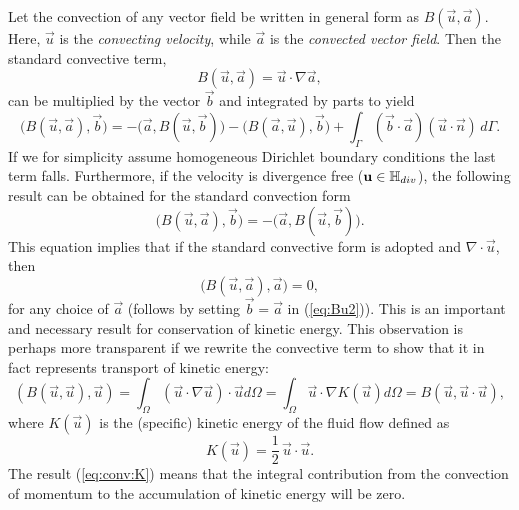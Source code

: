 Let the convection of any vector field be written in general form as $B(\vec{u},\vec{a})$. Here, $\vec{u}$ is the \emph{convecting velocity}, while $\vec{a}$ is the \emph{convected vector field}. Then the standard convective term,
\begin{equation}
B(\vec{u},\vec{a}) = \vec{u}\cdot \nabla \vec{a},
\end{equation}
can be multiplied by the vector $\vec{b}$ and integrated by parts to yield
\begin{equation}
 \bigl( B(\vec{u}, \vec{a}), \vec{b}\bigr) = -\bigl( \vec{a}, B(\vec{u},\vec{b})\bigr) - \bigl( B (\vec{a}, \vec{u}), \vec{b} \bigr) + \int_{\Gamma} \left(\vec{b} \cdot \vec{a} \right)\left(\vec{u} \cdot \vec{n} \right) \, d\Gamma.
\label{eq:Bu1}
\end{equation}
If we for simplicity assume homogeneous Dirichlet boundary conditions the last term falls. Furthermore, if the velocity is divergence free ($\mathbf{ u }\in \mathbb{H}_{div}$), the following result can be obtained for the standard convection form
\begin{equation}
\bigl( B(\vec{u},\vec{a}), \vec{b} \bigr) = -\bigl( \vec{a}, B(\vec{u},\vec{b}) \bigr).
\label{eq:Bu2}
\end{equation}
This equation implies that if
the standard convective form is adopted and $\nabla\cdot\vec{u}$, then
\begin{equation}
\bigl( B(\vec{u}, \vec{a}), \vec{a} \bigr) = 0,
\label{eq:B0}
\end{equation}
for any choice of $\vec{a}$ (follows by setting $\vec{b}=\vec{a}$ in
(\ref{eq:Bu2})). This is an important and necessary result for
conservation of kinetic energy. This observation is perhaps more
transparent if we rewrite the convective term to show that it in fact
represents transport of kinetic energy:
\begin{equation}
\label{eq:conv:K}
\left(B(\vec{u}, \vec{u}), \vec{u} \right)
= \int_\Omega (\vec{u}\cdot\nabla\vec{u})\cdot\vec{u}d\Omega
= \int_\Omega \vec{u}\cdot\nabla K(\vec{u}) d\Omega
= B(\vec{u}, \vec{u}\cdot\vec{u}),
\end{equation}
where $K(\vec{u})$ is the (specific) kinetic energy of the fluid flow defined
as
\begin{equation}
 K(\vec{u})=\frac{1}{2}\, \vec{u}\cdot \vec{u}. \label{eq:K}
\end{equation}
The result (\ref{eq:conv:K})  means that the integral
contribution from the convection of momentum to the accumulation of
kinetic energy will be zero.

